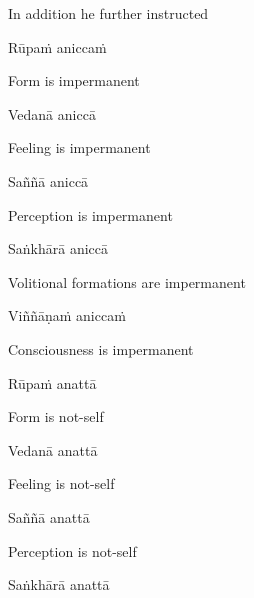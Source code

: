 \begin{english}
  In addition he further instructed
\end{english}

\suttaRef{[Thai]}

Rūpaṁ aniccaṁ

\begin{english}
  Form is impermanent
\end{english}

Vedanā aniccā

\begin{english}
  Feeling is impermanent
\end{english}

Saññā aniccā

\begin{english}
  Perception is impermanent
\end{english}

Saṅkhārā aniccā

\begin{english}
  Volitional formations are impermanent\makeatletter\hyperlink{endnote18-appendix}\makeatother
\end{english}

Viññāṇaṁ aniccaṁ

\begin{english}
  Consciousness is impermanent\makeatletter\hyperlink{endnote19-appendix}\makeatother
\end{english}

Rūpaṁ anattā

\begin{english}
  Form is not-self
\end{english}

Vedanā anattā

\begin{english}
  Feeling is not-self
\end{english}

Saññā anattā

\begin{english}
  Perception is not-self
\end{english}

Saṅkhārā anattā

